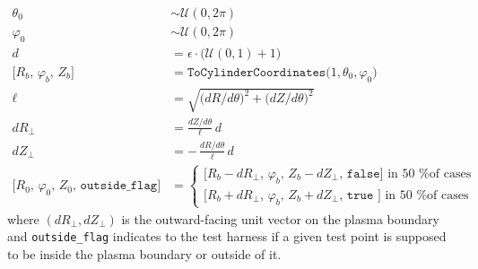 \begin{align}
%
\theta_0 &\sim \mathcal{U}(0,2\pi)\\
%
\varphi_0 &\sim \mathcal{U}(0,2\pi)\\
%
d & = \epsilon \cdot \bigl(\mathcal{U}(0,1) + 1\bigr)\\
%
\bigl[R_{b},\,\varphi_{b},\,Z_{b}\bigr] &= \texttt{ToCylinderCoordinates}\bigl(1, \theta_0, \varphi_0 \bigr)\\
%
\ell & = \sqrt{\bigl(dR/d\theta\bigr)^{2} + \bigl(dZ/d\theta\bigr)^{2}}\\
%
dR_{\perp} & = \frac{dZ/d\theta}{\ell}\,d\\
%
dZ_{\perp} & = -\,\frac{dR/d\theta}{\ell}\,d\\
%
\bigl[R_{0},\,\varphi_{0},\,Z_{0},\,\texttt{outside\_flag}\bigr] &=
\begin{cases}
\bigl[R_{b}-dR_{\perp},\,\varphi_{b},\,Z_{b}-dZ_{\perp},\, \texttt{false} \bigr] \textrm{ in 50 \% of cases }  \\
\bigl[R_{b}+dR_{\perp},\,\varphi_{b},\,Z_{b}+dZ_{\perp},\, \texttt{true } \bigr] \textrm{ in 50 \% of cases }
\end{cases}
\end{align}
%
where $(dR_{\perp}, dZ_{\perp})$ is the outward-facing unit vector on the plasma boundary
and \texttt{outside\_flag} indicates to the test harness if a given test point
is supposed to be inside the plasma boundary or outside of it.



